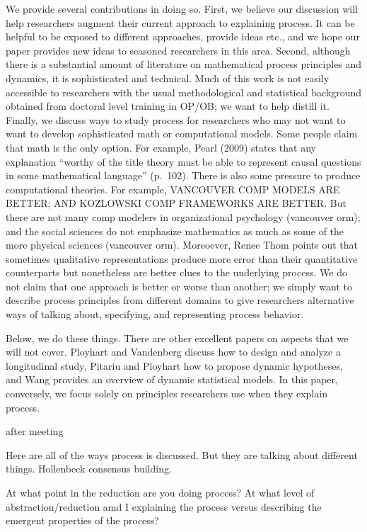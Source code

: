 \documentclass[english,,man]{apa6}
\theoremstyle{definition}
\theoremstyle{definition}
\theoremstyle{definition}
\theoremstyle{remark}
\begin{document}
We provide several contributions in doing so. First, we believe our
discussion will help researchers augment their current approach to
explaining process. It can be helpful to be exposed to different
approaches, provide ideas etc., and we hope our paper provides new ideas
to seasoned researchers in this area. Second, although there is a
substantial amount of literature on mathematical process principles and
dynamics, it is sophisticated and technical. Much of this work is not
easily accessible to researchers with the usual methodological and
statistical background obtained from doctoral level training in OP/OB;
we want to help distill it. Finally, we discuss ways to study process
for researchers who may not want to want to develop sophisticated math
or computational models. Some people claim that math is the only option.
For example, Pearl (2009) states that any explanation \enquote{worthy of
the title theory must be able to represent causal questions in some
mathematical language} (p.~102). There is also some pressure to produce
computational theories. For example, VANCOUVER COMP MODELS ARE BETTER;
AND KOZLOWSKI COMP FRAMEWORKS ARE BETTER. But there are not many comp
modelers in organizational psychology (vancouver orm); and the social
sciences do not emphasize mathematics as much as some of the more
physical sciences (vancouver orm). Moreoever, Renee Thom points out that
sometimes qualitative representations produce more error than their
quantitative counterparts but nonetheless are better clues to the
underlying process. We do not claim that one approach is better or worse
than another; we simply want to describe process principles from
different domains to give researchers alternative ways of talking about,
specifying, and representing process behavior.

Below, we do these things. There are other excellent papers on aspects
that we will not cover. Ployhart and Vandenberg discuss how to design
and analyze a longitudinal study, Pitariu and Ployhart how to propose
dynamic hypotheses, and Wang provides an overview of dynamic statistical
models. In this paper, conversely, we focus solely on principles
researchers use when they explain process.

after meeting

Here are all of the ways process is discussed. But they are talking
about different things. Hollenbeck consensus building.

At what point in the reduction are you doing process? At what level of
abstraction/reduction amd I explaining the process versus describing the
emergent properties of the process?
\end{document}
